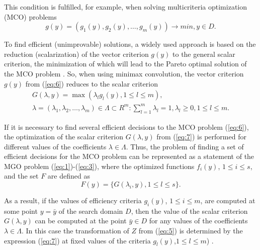 \documentclass[review]{elsarticle}
\begin{document}
This condition is fulfilled, for example, when solving multicriteria optimization (MCO) problems 
\begin{equation}\label{eq:6}
g(y) = (g_1(y), g_2(y), \dots , g_m(y)) \to min,  y\in D.
\end{equation}

To find efficient (unimprovable) solutions, a widely used approach is based on the reduction (scalarization) of the vector criterion $g(y)$ to the general scalar criterion, the minimization of which will lead to the Pareto optimal solution of the MCO problem \cite{c29,c30,c31,c32,c33}. So, when using minimax convolution, the vector criterion $g(y)$ from (\ref{eq:6}) reduces to the scalar criterion
\begin{equation}\label{eq:7}
\begin{matrix}
G(\lambda,y)=\max{(\lambda_l g_l(y),1 \leq l \leq m)},	\\
\lambda=(\lambda_1,\lambda_2,\dots,\lambda_m)\in \Lambda \subset R^m:\sum_{l=1}^m{\lambda_l =1},\lambda_l\geq 0,1 \leq l \leq m.
\end{matrix}
\end{equation}


If it is necessary to find several efficient decisions to the MCO problem (\ref{eq:6}), the optimization of the scalar criterion $G(\lambda,y)$ from (\ref{eq:7}) is performed for different values of the coefficients $\lambda \in \Lambda$. Thus, the problem of finding a set of efficient decisions for the MCO problem can be represented as a statement of the MGO problem (\ref{eq:1})-(\ref{eq:3}), where the optimized functions $f_i(y)$, $1 \leq i \leq s$, and the set $F$ are defined as
\begin{equation}\label{eq:8}
F(y)= \{ G(\lambda_i,y),1 \leq l \leq s\}.
\end{equation}

As a result, if the values of efficiency criteria $g_i(y)$, $1 \leq i \leq m$, are computed at some point $y=\bar{y}$ of the search domain $D$, then the value of the scalar criterion $G(\lambda,y)$ can be computed at the point $\bar{y} \in D$ for any values of the coefficients $\lambda \in \Lambda$. In this case the transformation of $Z$ from (\ref{eq:5}) is determined by the expression (\ref{eq:7}) at fixed values of the criteria $g_l (y)$,$1 \leq l \leq m$) \cite{c27,c28}.
\end{document}
